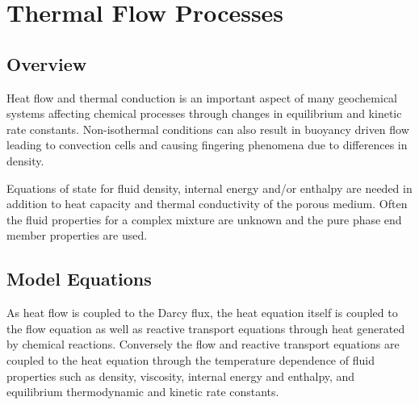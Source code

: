 %
%

\section{Thermal Flow Processes}

\label{sec:thermal-processes}

\subsection{Overview}

Heat flow and thermal conduction is an important aspect of many geochemical systems 
affecting chemical processes through changes in equilibrium and kinetic rate constants. 
Non-isothermal conditions can also result in buoyancy driven flow leading to convection cells 
and causing fingering phenomena due to differences in density.





Equations of state for fluid density, internal energy and/or enthalpy are needed 
in addition to heat capacity and thermal conductivity of the porous medium. 
Often the fluid properties for a complex mixture are unknown and the pure phase end member properties are used. 


\subsection{Model Equations}

As heat flow is coupled to the Darcy flux, the heat equation itself is coupled to the flow equation 
as well as reactive transport equations through heat generated by chemical reactions. 
Conversely the flow and reactive transport equations are coupled to the heat equation 
through the temperature dependence of fluid properties such as density, viscosity, internal energy and enthalpy, 
and equilibrium thermodynamic and kinetic rate constants.


